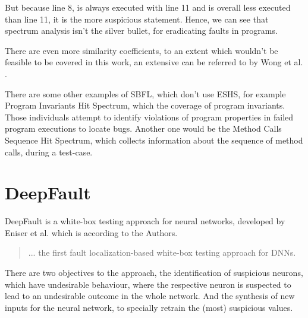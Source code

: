 But because line 8, is always executed with line 11 and is overall less executed than line 11, it is the more suspicious statement.
Hence, we can see that spectrum analysis isn't the silver bullet, for eradicating faults in programs.


There are even more similarity coefficients, to an extent which wouldn't be feasible to be covered in this work, an extensive can be referred to by Wong et al. \cite{wong_survey_2016}.

There are some other examples of SBFL, which don't use ESHS, for example Program Invariants Hit Spectrum, which the coverage of program invariants.
Those individuals attempt to identify violations of program properties in failed program executions to locate bugs.
Another one would be the Method Calls Sequence Hit Spectrum, which collects information about the sequence of method calls, during a test-case.

\section{DeepFault}\label{sec:deepfault}\cite{wong_dstar_2014}
DeepFault\cite{eniser_deepfault_2019} is a white-box testing approach for neural networks, developed by Eniser et al. which is according to the Authors.
\begin{quote}
    ... the first fault localization-based white-box testing approach for DNNs.
\end{quote}
There are two objectives to the approach, the identification of suspicious neurons, which have undesirable behaviour, where the respective neuron is suspected to lead to an undesirable outcome in the whole network.
And the synthesis of new inputs for the neural network, to specially retrain the (most) suspicious values.

